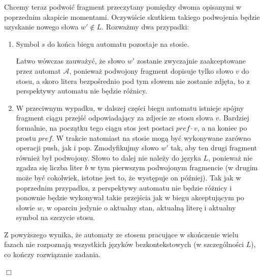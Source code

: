 \documentclass[12pt]{article}
\begin{document}
	\medskip
	
	Chcemy teraz podwoić fragment przeczytany pomiędzy dwoma opisanymi w
	poprzednim akapicie momentami. Oczywiście skutkiem takiego podwojenia będzie
	uzyskanie nowego słowa \(w' \notin L\). Rozważmy dwa przypadki:
	\begin{enumerate}
		\item Symbol \(s\) do końca biegu automatu pozostaje na stosie.
		      
		      Łatwo wówczas zauważyć, że słowo \(w'\) zostanie zwyczajnie
		      zaakceptowane przez automat \(\mathcal{A}\), ponieważ podwojony
		      fragment dopisuje tylko słowo \(v\) do stosu, a skoro litera
		      bezpośrednio pod tym słowem nie zostanie zdjęta, to z perspektywy
		      automatu nie będzie różnicy.
		
		\item W przeciwnym wypadku, w dalszej części biegu automatu istnieje
		      spójny fragment ciągu przejść odpowiadający za zdjecie ze stosu
		      słowa \(v\). Bardziej formalnie, na początku tego ciągu stos jest
		      postaci \(pref \cdot v\), a na koniec po prostu \(pref\). W
		      trakcie natomiast na stosie mogą być wykonywane zarówno operacji
		      push, jak i pop. Zmodyfikujmy słowo \(w'\) tak, aby ten drugi
		      fragment również był podwojony. Słowo to dalej nie należy do
		      języka \(L\), ponieważ nie zgadza się liczba liter \(b\) w tym
		      pierwszym podwojonym fragmencie (w drugim może być cokolwiek,
		      istotne jest to, że występuje on później). Tak jak w poprzednim
		      przypadku, z perspektywy automatu nie będzie różnicy i ponownie
		      będzie wykonywał takie przejścia jak w biegu akceptującym po
		      słowie \(w\), w oparciu jedynie o aktualny stan, aktualną literę i
		      aktualny symbol na szczycie stosu.
	\end{enumerate}
	
	\medskip
	
	Z powyższego wynika, że automaty ze stosem pracujące w skończenie wielu
	fazach nie rozpoznają wszystkich języków bezkontekstowych (w szczególności
	\(L\)), co kończy rozwiązanie zadania.
	\begin{flushright}
		\(\Box\)
	\end{flushright}
\end{document}
